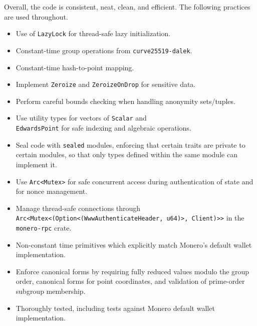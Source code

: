 \documentclass[12pt,a4paper]{article}
\begin{document}
Overall, the code is consistent, neat, clean, and efficient. The following practices are used throughout.
\begin{itemize}
\item Use of \texttt{LazyLock} for thread-safe lazy initialization.  %
\item Constant-time group operations from \texttt{curve25519-dalek}.  %
\item Constant-time hash-to-point mapping.  %
\item Implement \texttt{Zeroize} and \texttt{ZeroizeOnDrop} for sensitive data.  %
\item Perform careful bounds checking when handling anonymity sets/tuples. %

\item Use utility types for vectors of \texttt{Scalar} and \\\texttt{EdwardsPoint} for safe indexing and algebraic operations. 

\item Seal code with \texttt{sealed} modules, enforcing that certain traits are private to certain modules, so that only types defined within the same module can implement it.

\item Use \texttt{Arc<Mutex>} for safe concurrent access during authentication of state and for nonce management.

\item Manage thread-safe connections through \texttt{Arc<Mutex<(Option<(WwwAuthenticateHeader, u64)>, Client)>>} in the \texttt{monero-rpc} crate.

\item Non-constant time primitives which explicitly match Monero's default wallet implementation.

\item Enforce canonical forms by requiring fully reduced values modulo the group order, canonical forms for point coordinates, and validation of prime-order subgroup membership.

\item Thoroughly tested, including tests against Monero default wallet implementation.
\end{itemize}
\end{document}

